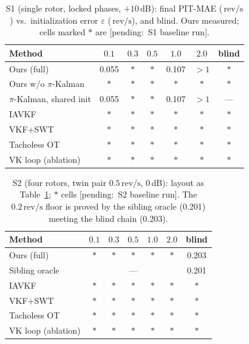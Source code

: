 \documentclass[journal]{IEEEtran}
\newcommand{\revps}{\ensuremath{\,\mathrm{rev/s}}}
\newcommand{\pending}[1]{{\color{gray}\textsf{[pending:~#1]}}}
\begin{document}
\begin{table}[t]
  \centering
  \caption{S1 (single rotor, locked phases, $+10$\,dB): final PIT-MAE
    (\revps) vs.\ initialization error $\varepsilon$ (\revps), and blind.
    Ours measured; cells marked $\ast$ are \pending{S1 baseline run}.}
  \label{tab:s1}
  \scriptsize
  \setlength{\tabcolsep}{3pt}
  \newcommand{\pd}{{\color{gray}$\ast$}}
  \begin{tabular}{@{}lcccccc@{}}
    \toprule
    Method & $0.1$ & $0.3$ & $0.5$ & $1.0$ & $2.0$ & blind \\
    \midrule
    Ours (full) & 0.055 & \pd & \pd & 0.107 & $>1$ & \pd \\
    Ours w/o $\pi$-Kalman & \pd & \pd & \pd & \pd & \pd & \pd \\
    $\pi$-Kalman, shared init & 0.055 & \pd & \pd & 0.107 & $>1$ & --- \\
    IAVKF~\cite{jiang2024iavkf} & \pd & \pd & \pd & \pd & \pd & \pd \\
    VKF+SWT~\cite{li2020vkswt} & \pd & \pd & \pd & \pd & \pd & \pd \\
    Tacholess OT~\cite{peeters2019tacholess} & \pd & \pd & \pd & \pd &
      \pd & \pd \\
    VK loop (ablation) & \pd & \pd & \pd & \pd & \pd & \pd \\
    \bottomrule
  \end{tabular}
\end{table}

\begin{table}[t]
  \centering
  \caption{S2 (four rotors, twin pair $0.5\revps$, 0\,dB): layout as
    Table~\ref{tab:s1}; $\ast$ cells \pending{S2 baseline run}. The $0.2\revps$ floor is proved by the sibling
    oracle (0.201) meeting the blind chain (0.203).}
  \label{tab:s2}
  \scriptsize
  \setlength{\tabcolsep}{3pt}
  \newcommand{\pd}{{\color{gray}$\ast$}}
  \begin{tabular}{@{}lcccccc@{}}
    \toprule
    Method & $0.1$ & $0.3$ & $0.5$ & $1.0$ & $2.0$ & blind \\
    \midrule
    Ours (full) & \pd & \pd & \pd & \pd & \pd & 0.203 \\
    Sibling oracle & \multicolumn{5}{c}{---} & 0.201 \\
    IAVKF & \pd & \pd & \pd & \pd & \pd & \pd \\
    VKF+SWT & \pd & \pd & \pd & \pd & \pd & \pd \\
    Tacholess OT & \pd & \pd & \pd & \pd & \pd & \pd \\
    VK loop (ablation) & \pd & \pd & \pd & \pd & \pd & \pd \\
    \bottomrule
  \end{tabular}
\end{table}
\end{document}
